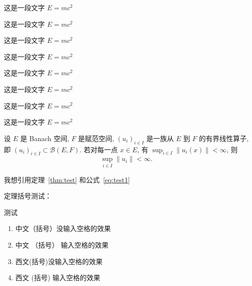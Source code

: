 \begin{corollary}
  这是一段文字 $E = m c^2$
\end{corollary}

\begin{lemma}
  这是一段文字 $E = m c^2$
\end{lemma}

\begin{axiom}
  这是一段文字 $E = m c^2$
\end{axiom}

\begin{counterexample}
  这是一段文字 $E = m c^2$
\end{counterexample}

\begin{conjecture}
  这是一段文字 $E = m c^2$
\end{conjecture}

\begin{question}
  这是一段文字 $E = m c^2$
\end{question}

\begin{claim}
  这是一段文字 $E = m c^2$
\end{claim}

\begin{remark}
  这是一段文字 $E = m c^2$
\end{remark}

\begin{theorem}\label{thm:test}
  设 $E$ 是 Banach 空间, $F$ 是赋范空间, $(u_i)_{i\in I}$ 是一族从 $E$ 到 $F$ 的有界线性算子,
  即 $(u_i)_{i\in I}\subset \mathcal{B}(E,F)$. 若对每一点 $x\in E$, 有
  $\sup_{i\in I} \|u_i(x)\|<\infty$, 则
  \begin{equation}\label{eq:test1}
    \sup_{i\in I} \|u_i\| < \infty.
  \end{equation}
\end{theorem}

我想引用定理~\ref{thm:test} 和公式~\ref{eq:test1}


定理括号测试：

\begin{theorem}
  测试
  \begin{enumerate}
    \item 中文（括号）没输入空格的效果
    \item 中文 （括号） 输入空格的效果
    \item 西文(括号)没输入空格的效果
    \item 西文 (括号) 输入空格的效果
  \end{enumerate}
\end{theorem} 


